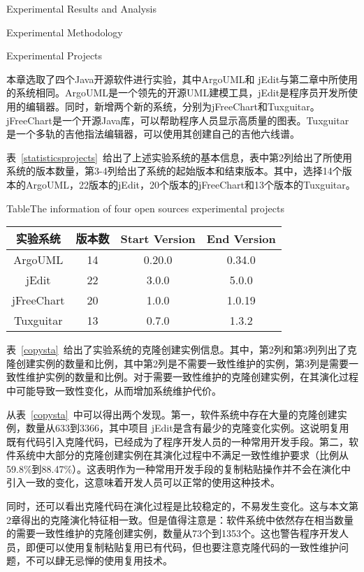 {Experimental Results and Analysis}

{Experimental Methodology}

{Experimental Projects}

本章选取了四个Java开源软件进行实验，其中ArgoUML和 jEdit与第二章中所使用的系统相同。ArgoUML是一个领先的开源UML建模工具，jEdit是程序员开发所使用的编辑器。同时，新增两个新的系统，分别为jFreeChart和Tuxguitar。jFreeChart是一个开源Java库，可以帮助程序人员显示高质量的图表。Tuxguitar是一个多轨的吉他指法编辑器，可以使用其创建自己的吉他六线谱。

表~\ref{statisticsprojects}~给出了上述实验系统的基本信息，表中第2列给出了所使用系统的版本数量，第3-4列给出了系统的起始版本和结束版本。其中，选择14个版本的ArgoUML，22版本的jEdit，20个版本的jFreeChart和13个版本的Tuxguitar。

\begin{table}[htbp]
{Table$\!$}{The information of four open sources experimental projects }
\vspace{0.5em}
\centering 
\wuhao
\begin{tabular}{cccc}
\toprule[1.5pt ]
{实验系统}&{版本数}&Start Version&End Version\\ 
\midrule[1pt]
ArgoUML&14&0.20.0&0.34.0\\ 
jEdit&22&3.0.0&5.0.0\\ 
jFreeChart&20&1.0.0&1.0.19\\ 
Tuxguitar&13&0.7.0&1.3.2\\ 
\bottomrule[1.5pt]
\end{tabular}
\end{table}

表~\ref{copysta}~给出了实验系统的克隆创建实例信息。其中，第2列和第3列列出了克隆创建实例的数量和比例，其中第2列是不需要一致性维护的实例，第3列是需要一致性维护实例的数量和比例。对于需要一致性维护的克隆创建实例，在其演化过程中可能导致一致性变化，从而增加系统维护代价。

从表~\ref{copysta}~中可以得出两个发现。第一，软件系统中存在大量的克隆创建实例，数量从633到3366，其中项目 jEdit是含有最少的克隆变化实例。这说明复用既有代码引入克隆代码，已经成为了程序开发人员的一种常用开发手段。第二，软件系统中大部分的克隆创建实例在其演化过程中不满足一致性维护要求（比例从59.8\%到88.47\%）。这表明作为一种常用开发手段的复制粘贴操作并不会在演化中引入一致的变化，这意味着开发人员可以正常的使用这种技术。

同时，还可以看出克隆代码在演化过程是比较稳定的，不易发生变化。这与本文第2章得出的克隆演化特征相一致。但是值得注意是：软件系统中依然存在相当数量的需要一致性维护的克隆创建实例，数量从73个到1353个。这也警告程序开发人员，即便可以使用复制粘贴复用已有代码，但也要注意克隆代码的一致性维护问题，不可以肆无忌惮的使用复用技术。

